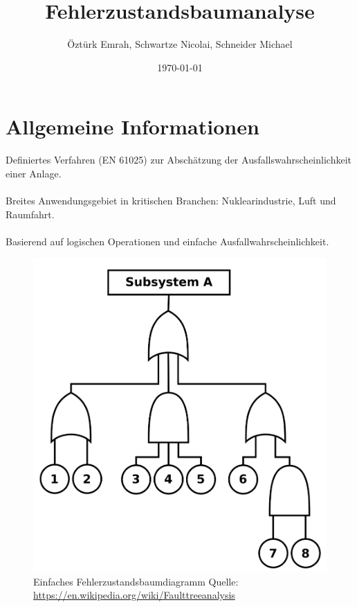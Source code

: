 \documentclass{beamer}
\title{Fehlerzustandsbaumanalyse}
\author{Öztürk Emrah, Schwartze Nicolai, Schneider Michael}
\date{\today}
\begin{document}
\maketitle

\section{Allgemeine Informationen}
\frame{\tableofcontents[currentsection]}
\begin{frame}
	Definiertes Verfahren (EN 61025) zur Abschätzung der Ausfallswahrscheinlichkeit einer Anlage.\\~\\
	Breites Anwendungsgebiet in kritischen Branchen: Nuklearindustrie, Luft und Raumfahrt.\\~\\
	Basierend auf logischen Operationen und einfache Ausfallwahrscheinlichkeit.
\end{frame}


\begin{frame}
\begin{figure}
	\centering
	\includegraphics[width=0.6\linewidth]{fault_tree_example}
	\caption{Einfaches Fehlerzustandsbaumdiagramm Quelle: \href{https://en.wikipedia.org/wiki/Fault_tree_analysis}{https://en.wikipedia.org/wiki/Fault\textunderscore tree\textunderscore analysis}}
	\label{fig:faulttreeexample}
\end{figure}
\end{frame}

\begin{frame}
	
	
	
\end{frame}
	
\end{document}
